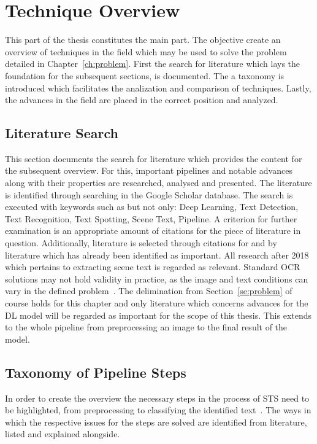 \chapter{Technique Overview}\label{ch:research}
This part of the thesis constitutes the main part.
The objective create an overview of techniques in the field which may be used to solve the problem
detailed in Chapter~\ref{ch:problem}.
First the search for literature which lays the foundation for the subsequent sections, is documented.
The a taxonomy is introduced which facilitates the analization and comparison of techniques.
Lastly, the advances in the field are placed in the correct position and analyzed.

\section{Literature Search}\label{se:litSearch}
This section documents the search for literature which provides the content for the subsequent
overview.
For this, important pipelines and notable advances along with their properties are researched,
analysed and presented.
The literature is identified through searching in the Google Scholar database.
The search is executed with keywords such as but not only: Deep Learning, Text Detection,
Text Recognition, Text Spotting, Scene Text, Pipeline.
A criterion for further examination is an appropriate amount of citations for the piece of literature
in question.
Additionally, literature is selected through citations for and by literature which has already been
identified as important.
All research after 2018 which pertains to extracting scene text is regarded as relevant.
Standard \ac{OCR} solutions may not hold validity in practice, as the image and text conditions can
vary in the defined problem~\citep{chen_text_2021}.
The delimination from Section~\ref{se:problem} of course holds for this chapter and only literature
which concerns advances for the \ac{DL} model will be regarded as important for the scope of this
thesis.
This extends to the whole pipeline from preprocessing an image to the final result of the model.


\section{Taxonomy of Pipeline Steps}
In order to create the overview the necessary steps in the process of \ac{STS} need to be highlighted,
from preprocessing to classifying the identified text~\citep{long_scene_2021, sourvanos_challenges_2018}.
The ways in which the respective issues for the steps are solved are identified from literature,
listed and explained alongside.

